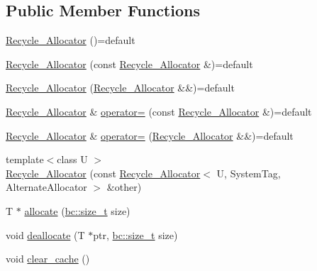 \subsection*{Public Member Functions}
\begin{DoxyCompactItemize}
\item 
\hyperlink{structbc_1_1allocators_1_1Recycle__Allocator_a235e55a62d21219403f32b5af24d7864}{Recycle\+\_\+\+Allocator} ()=default
\item 
\hyperlink{structbc_1_1allocators_1_1Recycle__Allocator_a171b92c4204b4bf7bf8c9ef29be4470c}{Recycle\+\_\+\+Allocator} (const \hyperlink{structbc_1_1allocators_1_1Recycle__Allocator}{Recycle\+\_\+\+Allocator} \&)=default
\item 
\hyperlink{structbc_1_1allocators_1_1Recycle__Allocator_a330dbed300aa0dc5d67fa5974efec666}{Recycle\+\_\+\+Allocator} (\hyperlink{structbc_1_1allocators_1_1Recycle__Allocator}{Recycle\+\_\+\+Allocator} \&\&)=default
\item 
\hyperlink{structbc_1_1allocators_1_1Recycle__Allocator}{Recycle\+\_\+\+Allocator} \& \hyperlink{structbc_1_1allocators_1_1Recycle__Allocator_ab4b0f33002a9d103d6212a7b9976d8a9}{operator=} (const \hyperlink{structbc_1_1allocators_1_1Recycle__Allocator}{Recycle\+\_\+\+Allocator} \&)=default
\item 
\hyperlink{structbc_1_1allocators_1_1Recycle__Allocator}{Recycle\+\_\+\+Allocator} \& \hyperlink{structbc_1_1allocators_1_1Recycle__Allocator_a1b17506ad1426bbd115458b7cadb575d}{operator=} (\hyperlink{structbc_1_1allocators_1_1Recycle__Allocator}{Recycle\+\_\+\+Allocator} \&\&)=default
\item 
{\footnotesize template$<$class U $>$ }\\\hyperlink{structbc_1_1allocators_1_1Recycle__Allocator_a65fb793bf5bba8c22aaf79314e4c218b}{Recycle\+\_\+\+Allocator} (const \hyperlink{structbc_1_1allocators_1_1Recycle__Allocator}{Recycle\+\_\+\+Allocator}$<$ U, System\+Tag, Alternate\+Allocator $>$ \&other)
\item 
T $\ast$ \hyperlink{structbc_1_1allocators_1_1Recycle__Allocator_a1b961439f6fa21100d1e23a7246982fe}{allocate} (\hyperlink{namespacebc_aaf8e3fbf99b04b1b57c4f80c6f55d3c5}{bc\+::size\+\_\+t} size)
\item 
void \hyperlink{structbc_1_1allocators_1_1Recycle__Allocator_a88a5438416502d49e3c9308c9053b44f}{deallocate} (T $\ast$ptr, \hyperlink{namespacebc_aaf8e3fbf99b04b1b57c4f80c6f55d3c5}{bc\+::size\+\_\+t} size)
\item 
void \hyperlink{structbc_1_1allocators_1_1Recycle__Allocator_a1e590ab61de9111227b368d20c15112d}{clear\+\_\+cache} ()

\end{DoxyCompactItemize}
